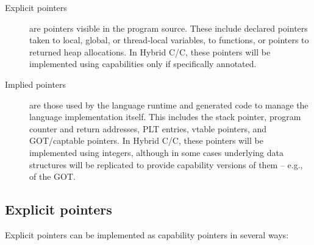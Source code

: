 \documentclass[12pt,twoside,openright,a4paper]{article}
\newcommand{\note}[2]{{\color{blue}[ Note: #1 - #2]}}
\renewcommand{\note}[2]{\relax\ifhmode\unskip\fi}
\newcommand{\psnote}[1]{\note{#1}{Peter S.}}
\newcommand*{\cpp}{\texorpdfstring{C\textsmaller[2]{\protect\nolinebreak[4]\hspace{-.05em}\raisebox{.45ex}{\textbf{++}}}}{C++}}
\newcommand*{\COrCpp}{C/\cpp{}}
\newcommand*{\hybridCOrCpp}{Hybrid \COrCpp{}}
\begin{document}
\begin{description}
\item[Explicit pointers] are pointers visible in the program source.
  These include declared pointers taken to local, global, or thread-local
  variables, to functions, or pointers to returned heap allocations.
  In \hybridCOrCpp{}, these pointers will be implemented using capabilities
  only if specifically annotated.

\item[Implied pointers] are those used by the language runtime and generated
  code to manage the language implementation itself.
  This includes the stack pointer, program counter and return addresses, PLT
  entries, vtable pointers, and GOT/captable pointers.
  \psnote{wonder whether it'd be useful in this document to briefly explain what each of these latter three are for, to make it useful for C/C++ programmers and semanticists who aren't familiar with these internals?}
  \psnote{actually, maybe it's worth (time permitting) explaining all these, including side-by-side how they work in vanilla, pure-cap, and hybrid?}
  In \hybridCOrCpp{}, these pointers will be implemented using integers,
  although in some cases
\psnote{probably we should be explicit here about which and why, not just ``eg of the GOT''}
  underlying data structures will be replicated to
  provide capability versions of them -- e.g., of the GOT.
\end{description}

\subsection{Explicit pointers}

Explicit pointers can be implemented as capability pointers in several ways:
\end{document}
